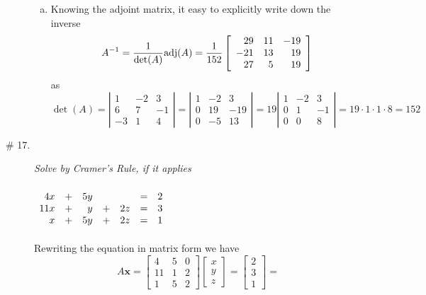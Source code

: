 \documentclass[8pt]{article} %
\begin{document}
\begin{description}
{\begin{enumerate}[(a)]
\[\begin{array}{rr}
					6& -1\\
				\end{array}\right|=1\cdot(-1)-6\cdot3=-19\]
			\item Knowing the adjoint matrix, it easy to explicitly write down the inverse
				\[A^{-1}=\frac{1}{\det(A)}\mbox{adj}(A)=\frac{1}{152}
				\left[\begin{array}{rrr}
					29&11&-19\\
					-21&13&19\\
					27&5&19
				\end{array}\right]\]
				as
				\[
				\det(A)=\left|\begin{array}{rrr}
					1&-2&3\\6&7&-1\\-3&1&4
				\end{array}\right|=
				\left|\begin{array}{rrr}
					1&-2&3\\0&19&-19\\0&-5&13
				\end{array}\right|=
				19\left|\begin{array}{rrr}
					1&-2&3\\0&1&-1\\0&0&8
				\end{array}\right|=19\cdot1\cdot1\cdot8=152
				\]
		\end{enumerate}
		}
	\item[\# 17.]{{\it Solve by Cramer's Rule, if it applies\\\\
			$\begin{array}[t]{rrrrrrr}
				4x & + {} & 5y & & & = & 2\\
				11x & + {} & y & + {} & 2z& = & 3\\
				x & + {} & 5y & + {} & 2z& = & 1
			\end{array}$\\\\
			}Rewriting the equation in matrix form we have
			\[A\mathbf{x}=
			\begin{bmatrix}4&5&0\\11&1&2\\1&5&2\end{bmatrix}\begin{bmatrix}x\\y\\z\end{bmatrix}=\begin{bmatrix}2\\3\\1\end{bmatrix}=
\]}
\end{description}
\end{document}
